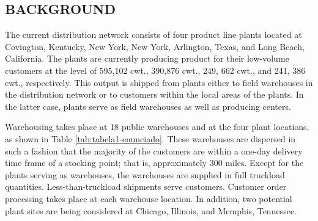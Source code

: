 \documentclass[12pt,a4paper]{article}
\begin{document}
\subsection{BACKGROUND}

The current distribution network consists of four product line plants located
at Covington, Kentucky, New York, New York, Arlington, Texas, and Long Beach, California.
The plants are currently producing product for their low-volume customers at the level of 595,102 cwt., 390,876 cwt., 249, 662 cwt., and 241, 386 cwt., respectively.
This output is shipped from plants either to field warehouses in the distribution network or to customers within the local areas of the plants.
In the latter case, plants serve as field warehouses as well as producing centers.

Warehousing takes place at 18 public warehouses and at the four plant locations, as shown in Table \ref{tab:tabela1-enunciado}.
These warehouses are dispersed in such a fashion that the majority of the customers are within a one-day delivery time frame of a stocking point; that is, approximately 300 miles.
Except for the plants serving as warehouses, the warehouses are supplied in full truckload quantities.
Less-than-truckload shipments serve customers.
Customer order processing takes place at each warehouse location.
In addition, two potential plant sites are being considered at Chicago, Illinois, and Memphis, Tennessee.
\end{document}
